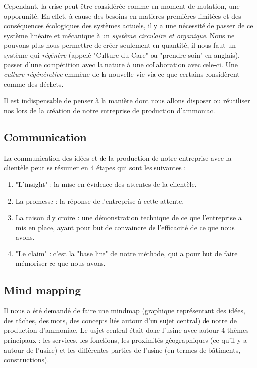 Cependant, la crise peut être considérée comme un moment de mutation, une opporunité.
En effet, à cause des besoins en matières premières limitées et des conséquences écologiques
des systèmes actuels, il y a une nécessité de passer de ce système linéaire et mécanique à
un \textit{système circulaire et organique}. Nous ne pouvons plus nous permettre de créer
seulement en quantité, il nous faut un système qui \textit{régénère} (appelé "Culture du Care"
ou "prendre soin" en anglais), passer d'une compétition avec la nature à une collaboration avec cele-ci.
Une \textit{culture régénérative} emmène de la nouvelle vie via ce que certains considèrent comme des déchets.

Il est indispensable de penser à la manière dont nous allons disposer ou réutiliser nos lors de la création de 
notre entreprise de production d'ammoniac.

\subsection{Communication}
La communication des idées et de la production de notre entreprise avec la clientèle peut se résumer 
en 4 étapes qui sont les suivantes :

\begin{enumerate}
	\item "L'insight" : la mise en évidence des attentes de la clientèle.
	\item La promesse : la réponse de l'entreprise à cette attente.
	\item La raison d'y croire : une démonstration technique de ce que l'entreprise a mis en place,
	ayant pour but de convaincre de l'efficacité de ce que nous avons.
	\item "Le claim" : c'est la "base line" de notre méthode, qui a pour but de faire mémoriser ce que nous avons.
\end{enumerate}

\subsection{Mind mapping}
Il nous a été demandé de faire une mindmap (graphique représentant des idées, des tâches, des mots,
des concepts liés autour d'un sujet central) de notre de production d'ammoniac.
Le usjet central était donc l'usine avec autour 4 thèmes principaux : les services, les fonctions,
les proximités géographiques (ce qu'il y a autour de l'usine) et les différentes parties de l'usine
(en termes de bâtiments, constructions).


